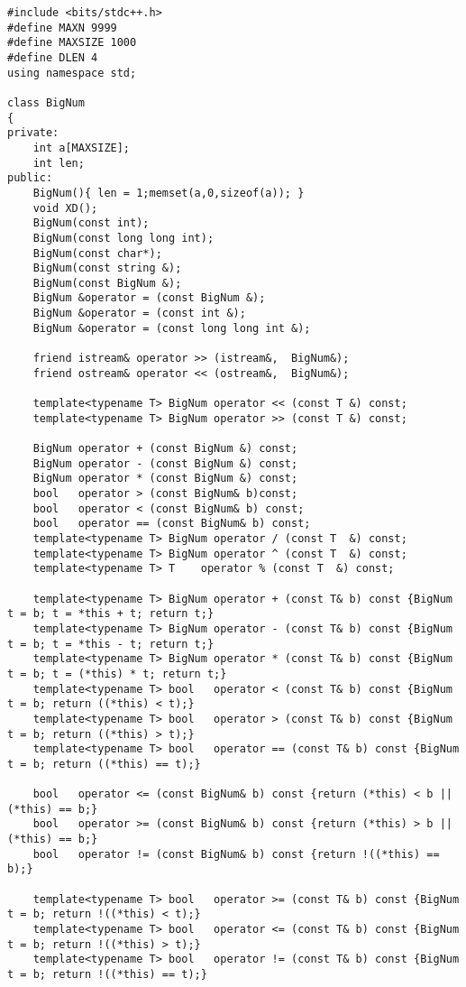 \begin{lstlisting}
#include <bits/stdc++.h>
#define MAXN 9999
#define MAXSIZE 1000
#define DLEN 4
using namespace std;

class BigNum
{
private:
    int a[MAXSIZE];
    int len;
public:
    BigNum(){ len = 1;memset(a,0,sizeof(a)); }
    void XD();
    BigNum(const int);
    BigNum(const long long int);
    BigNum(const char*);
    BigNum(const string &);
    BigNum(const BigNum &);
    BigNum &operator = (const BigNum &);
    BigNum &operator = (const int &);
    BigNum &operator = (const long long int &);

    friend istream& operator >> (istream&,  BigNum&);
    friend ostream& operator << (ostream&,  BigNum&);

    template<typename T> BigNum operator << (const T &) const;
    template<typename T> BigNum operator >> (const T &) const;

    BigNum operator + (const BigNum &) const;
    BigNum operator - (const BigNum &) const;
    BigNum operator * (const BigNum &) const;
    bool   operator > (const BigNum& b)const;
    bool   operator < (const BigNum& b) const;
    bool   operator == (const BigNum& b) const;
    template<typename T> BigNum operator / (const T  &) const;
    template<typename T> BigNum operator ^ (const T  &) const;
    template<typename T> T    operator % (const T  &) const;

    template<typename T> BigNum operator + (const T& b) const {BigNum t = b; t = *this + t; return t;}
    template<typename T> BigNum operator - (const T& b) const {BigNum t = b; t = *this - t; return t;}
    template<typename T> BigNum operator * (const T& b) const {BigNum t = b; t = (*this) * t; return t;}
    template<typename T> bool   operator < (const T& b) const {BigNum t = b; return ((*this) < t);}
    template<typename T> bool   operator > (const T& b) const {BigNum t = b; return ((*this) > t);}
    template<typename T> bool   operator == (const T& b) const {BigNum t = b; return ((*this) == t);}

    bool   operator <= (const BigNum& b) const {return (*this) < b || (*this) == b;}
    bool   operator >= (const BigNum& b) const {return (*this) > b || (*this) == b;}
    bool   operator != (const BigNum& b) const {return !((*this) == b);}

    template<typename T> bool   operator >= (const T& b) const {BigNum t = b; return !((*this) < t);}
    template<typename T> bool   operator <= (const T& b) const {BigNum t = b; return !((*this) > t);}
    template<typename T> bool   operator != (const T& b) const {BigNum t = b; return !((*this) == t);}


\end{lstlisting}

